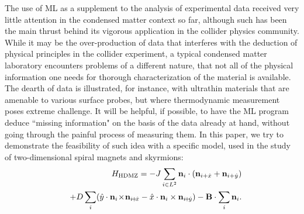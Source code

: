 \documentclass[reprint,amsmath,amssymb,aps,showpacs,superscriptaddress,prl]{revtex4-1}
\newcommand{\ba}{\begin{eqnarray}}
\newcommand{\ea}{\end{eqnarray}}
\renewcommand{\v}[1]{{\bf #1}}
\newcommand{\nn}{\nonumber \\}
\begin{document}
The use of ML as a supplement to the analysis of experimental data received very little attention in the condensed matter context  so far, although such has been the main thrust behind its vigorous application in the collider physics community. While it may be the over-production of data that interferes with the deduction of physical principles in the collider experiment, a typical condensed matter laboratory encounters problems of a different nature, that not all of the physical information one needs for thorough characterization of the material is available. The dearth of data is illustrated, for instance, with ultrathin materials that are amenable to various surface probes, but where thermodynamic measurement poses extreme challenge. It will be helpful, if possible, to have the ML program deduce ``missing information" on the basis of the data already at hand, without going through the painful process of measuring them. In this paper, we try to demonstrate the feasibility of such idea with a specific model, used in the study of two-dimensional spiral magnets and skyrmions:
%
\ba && H_{\rm HDMZ} = -J \sum_{i\in L^2} \v n_i \cdot (\v n_{i+\hat{x}} + \v n_{i+\hat{y}} ) \nn
 & & + D \sum_i ( \hat{y} \cdot \v n_i \! \times \! \v n_{i\! +\! \hat{x}} - \hat{x} \cdot \v n_i \times \v n_{i\! +\! \hat{y}} )  - \v B \cdot \sum_i \v n_i .  \label{eq:HDMZ} \ea
%
\end{document}
